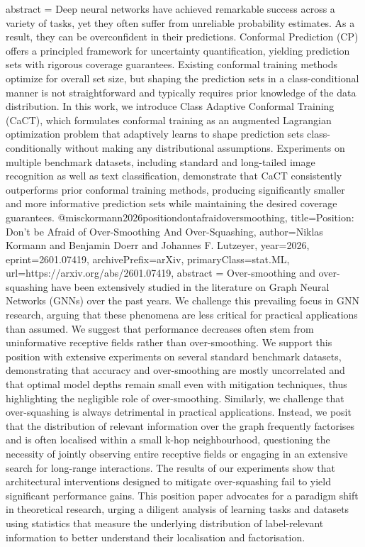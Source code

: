 {      abstract = {Deep neural networks have achieved remarkable success across a variety of tasks, yet they often suffer from unreliable probability estimates. As a result, they can be overconfident in their predictions. Conformal Prediction (CP) offers a principled framework for uncertainty quantification, yielding prediction sets with rigorous coverage guarantees. Existing conformal training methods optimize for overall set size, but shaping the prediction sets in a class-conditional manner is not straightforward and typically requires prior knowledge of the data distribution. In this work, we introduce Class Adaptive Conformal Training (CaCT), which formulates conformal training as an augmented Lagrangian optimization problem that adaptively learns to shape prediction sets class-conditionally without making any distributional assumptions. Experiments on multiple benchmark datasets, including standard and long-tailed image recognition as well as text classification, demonstrate that CaCT consistently outperforms prior conformal training methods, producing significantly smaller and more informative prediction sets while maintaining the desired coverage guarantees.}
}@misc{kormann2026positiondontafraidoversmoothing,
      title={Position: Don't be Afraid of Over-Smoothing And Over-Squashing}, 
      author={Niklas Kormann and Benjamin Doerr and Johannes F. Lutzeyer},
      year={2026},
      eprint={2601.07419},
      archivePrefix={arXiv},
      primaryClass={stat.ML},
      url={https://arxiv.org/abs/2601.07419},
      abstract = {Over-smoothing and over-squashing have been extensively studied in the literature on Graph Neural Networks (GNNs) over the past years. We challenge this prevailing focus in GNN research, arguing that these phenomena are less critical for practical applications than assumed. We suggest that performance decreases often stem from uninformative receptive fields rather than over-smoothing. We support this position with extensive experiments on several standard benchmark datasets, demonstrating that accuracy and over-smoothing are mostly uncorrelated and that optimal model depths remain small even with mitigation techniques, thus highlighting the negligible role of over-smoothing. Similarly, we challenge that over-squashing is always detrimental in practical applications. Instead, we posit that the distribution of relevant information over the graph frequently factorises and is often localised within a small k-hop neighbourhood, questioning the necessity of jointly observing entire receptive fields or engaging in an extensive search for long-range interactions. The results of our experiments show that architectural interventions designed to mitigate over-squashing fail to yield significant performance gains. This position paper advocates for a paradigm shift in theoretical research, urging a diligent analysis of learning tasks and datasets using statistics that measure the underlying distribution of label-relevant information to better understand their localisation and factorisation.}
}
